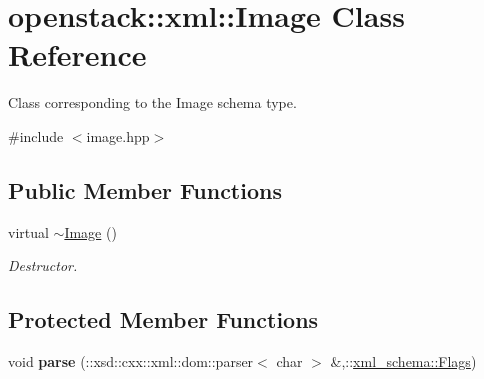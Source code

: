 \hypertarget{classopenstack_1_1xml_1_1Image}{
\section{openstack::xml::Image Class Reference}
\label{classopenstack_1_1xml_1_1Image}
}


Class corresponding to the Image schema type.  




{\ttfamily \#include $<$image.hpp$>$}

\subsection*{Public Member Functions}
\begin{DoxyCompactItemize}
\item 
\hypertarget{classopenstack_1_1xml_1_1Image_a46eca2686a59c35513dbaa73aff390e9}{
virtual \hyperlink{classopenstack_1_1xml_1_1Image_a46eca2686a59c35513dbaa73aff390e9}{$\sim$Image} ()}
\label{classopenstack_1_1xml_1_1Image_a46eca2686a59c35513dbaa73aff390e9}

\begin{DoxyCompactList}\small\item\em Destructor. \item\end{DoxyCompactList}\end{DoxyCompactItemize}
\subsection*{Protected Member Functions}
\begin{DoxyCompactItemize}
\item 
\hypertarget{classopenstack_1_1xml_1_1Image_a5b6f90c35f5a50dbd19b1a9075fc476b}{
void {\bfseries parse} (::xsd::cxx::xml::dom::parser$<$ char $>$ \&,::\hyperlink{namespacexml__schema_affb4c227cbd9aa7453dd1dc5a1401943}{xml\_\-schema::Flags})}
\label{classopenstack_1_1xml_1_1Image_a5b6f90c35f5a50dbd19b1a9075fc476b}

\end{DoxyCompactItemize}
